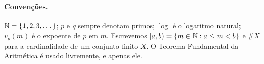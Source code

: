 \paragraph{Convenções.} $\mathbb{N}=\{1,2,3,\dots\}$; $p$ e $q$ sempre denotam primos;
$\log$ é o logaritmo natural; $v_p(m)$ é o expoente de $p$ em $m$. Escrevemos
$[a,b)=\{m\in\mathbb{N}: a\le m<b\}$ e $\#X$ para a cardinalidade de um conjunto finito
$X$. O Teorema Fundamental da Aritmética é usado livremente, e apenas ele.
